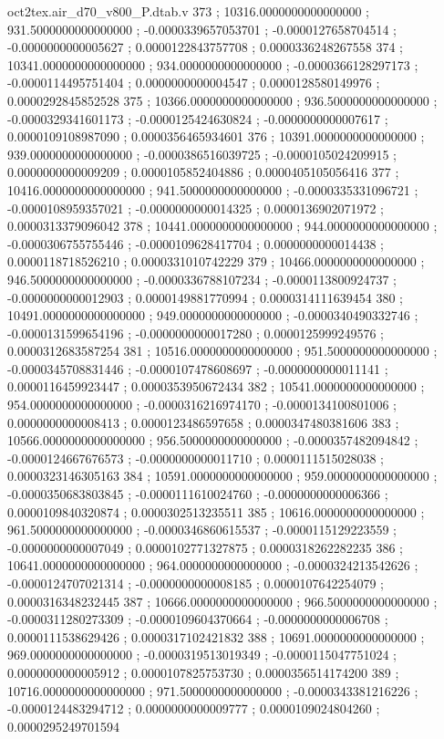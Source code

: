 \begin{filecontents}[overwrite]{oct2tex.air_d70_v800_P.dtab.v}
373 ; 10316.0000000000000000 ; 931.5000000000000000 ; -0.0000339657053701 ; -0.0000127658704514 ; -0.0000000000005627 ; 0.0000122843757708 ; 0.0000336248267558
374 ; 10341.0000000000000000 ; 934.0000000000000000 ; -0.0000366128297173 ; -0.0000114495751404 ; 0.0000000000004547 ; 0.0000128580149976 ; 0.0000292845852528
375 ; 10366.0000000000000000 ; 936.5000000000000000 ; -0.0000329341601173 ; -0.0000125424630824 ; -0.0000000000007617 ; 0.0000109108987090 ; 0.0000356465934601
376 ; 10391.0000000000000000 ; 939.0000000000000000 ; -0.0000386516039725 ; -0.0000105024209915 ; 0.0000000000009209 ; 0.0000105852404886 ; 0.0000405105056416
377 ; 10416.0000000000000000 ; 941.5000000000000000 ; -0.0000335331096721 ; -0.0000108959357021 ; -0.0000000000014325 ; 0.0000136902071972 ; 0.0000313379096042
378 ; 10441.0000000000000000 ; 944.0000000000000000 ; -0.0000306755755446 ; -0.0000109628417704 ; 0.0000000000014438 ; 0.0000118718526210 ; 0.0000331010742229
379 ; 10466.0000000000000000 ; 946.5000000000000000 ; -0.0000336788107234 ; -0.0000113800924737 ; -0.0000000000012903 ; 0.0000149881770994 ; 0.0000314111639454
380 ; 10491.0000000000000000 ; 949.0000000000000000 ; -0.0000340490332746 ; -0.0000131599654196 ; -0.0000000000017280 ; 0.0000125999249576 ; 0.0000312683587254
381 ; 10516.0000000000000000 ; 951.5000000000000000 ; -0.0000345708831446 ; -0.0000107478608697 ; -0.0000000000011141 ; 0.0000116459923447 ; 0.0000353950672434
382 ; 10541.0000000000000000 ; 954.0000000000000000 ; -0.0000316216974170 ; -0.0000134100801006 ; 0.0000000000008413 ; 0.0000123486597658 ; 0.0000347480381606
383 ; 10566.0000000000000000 ; 956.5000000000000000 ; -0.0000357482094842 ; -0.0000124667676573 ; -0.0000000000011710 ; 0.0000111515028038 ; 0.0000323146305163
384 ; 10591.0000000000000000 ; 959.0000000000000000 ; -0.0000350683803845 ; -0.0000111610024760 ; -0.0000000000006366 ; 0.0000109840320874 ; 0.0000302513235511
385 ; 10616.0000000000000000 ; 961.5000000000000000 ; -0.0000346860615537 ; -0.0000115129223559 ; -0.0000000000007049 ; 0.0000102771327875 ; 0.0000318262282235
386 ; 10641.0000000000000000 ; 964.0000000000000000 ; -0.0000324213542626 ; -0.0000124707021314 ; -0.0000000000008185 ; 0.0000107642254079 ; 0.0000316348232445
387 ; 10666.0000000000000000 ; 966.5000000000000000 ; -0.0000311280273309 ; -0.0000109604370664 ; -0.0000000000006708 ; 0.0000111538629426 ; 0.0000317102421832
388 ; 10691.0000000000000000 ; 969.0000000000000000 ; -0.0000319513019349 ; -0.0000115047751024 ; 0.0000000000005912 ; 0.0000107825753730 ; 0.0000356514174200
389 ; 10716.0000000000000000 ; 971.5000000000000000 ; -0.0000343381216226 ; -0.0000124483294712 ; 0.0000000000009777 ; 0.0000109024804260 ; 0.0000295249701594

\end{filecontents}
